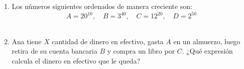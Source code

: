 \documentclass[11pt,letterpaper]{article}
\newenvironment{alternativas}{%
\begin{enumerate}[label=\Alph*), leftmargin=14pt, itemsep=2pt, topsep=2pt]
}{\end{enumerate}}
\begin{document}
\begin{enumerate}[label=\textbf{\arabic*.}, leftmargin=*, itemsep=7pt]
\item
\begin{minipage}[t]{\linewidth}
Los números siguientes ordenados de manera creciente son: 
\[
A=20^{10},\quad B=3^{40},\quad C=12^{20},\quad D=2^{50}
\]
\\%
\begin{minipage}{\linewidth}
\vspace{7mm}
\end{minipage}
\vspace{7mm}
\end{minipage}

\item
\begin{minipage}[t]{\linewidth}
Ana tiene $X$ cantidad de dinero en efectivo, gasta $A$ en un almuerzo, luego retira de su cuenta bancaria $B$ y compra un libro por $C$. ¿Qué expresión calcula el dinero en efectivo que le queda?\\
\\%
\begin{minipage}{\linewidth}
\vspace{7mm}
\end{minipage}
\vspace{7mm}
\end{minipage}

\end{enumerate}
\end{document}
